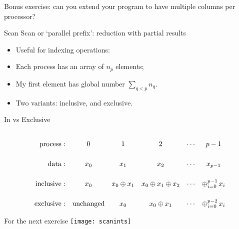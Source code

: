 \begin{optexerciseframe}
  Bonus exercise: can you extend your program to have multiple columns
  per processor?
\end{optexerciseframe}


\begin{numberedframe}{Scan}
Scan or `parallel prefix': reduction with partial results

\begin{itemize}
\item Useful for indexing operations:
\item Each process has an array of $n_p$ elements;
\item My first element has global number $\sum_{q<p}n_q$.
\item Two variants:  inclusive, and
   exclusive.
\end{itemize}
\end{numberedframe}

\begin{numberedframe}{In vs Exclusive}
  \def\strut{\vrule height 25pt width 0pt\relax}
\[
\begin{array}{rccccc}
  \mathrm{process:}\strut
      &0&1&2&\cdots&p-1\\
  \mathrm{data:}\strut
      &x_0&x_1&x_2&\cdots&x_{p-1}\\
  \mathrm{inclusive:}\strut
      &x_0&x_0\oplus x_1&x_0\oplus x_1\oplus x_2&\cdots&\mathop\oplus_{i=0}^{p-1} x_i\\
  \mathrm{exclusive:}\strut
      &\mathrm{unchanged}&x_0&x_0\oplus x_1&\cdots&\mathop\oplus_{i=0}^{p-2} x_i\\
\end{array}
\]
\end{numberedframe}


\begin{numberedframe}{For the next exercise}
  \label{fig:scanints}
  \texttt{[image: scanints]}
\end{numberedframe}

\begin{exerciseframe}[scangather]
  
\end{exerciseframe}



